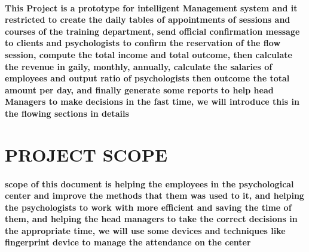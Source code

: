 \documentclass[../Psychological_system_web_application.tex]{subfiles}
\begin{document}
			\paragraph*{This Project is a prototype for intelligent Management system and it restricted to create the daily tables of appointments of sessions and courses of the training department, send official confirmation message to clients and \gls{psychologist}s to confirm the reservation of the flow session, compute the total income and total outcome, then calculate the revenue in gaily, monthly, annually, calculate the salaries of employees and output ratio of psychologists then outcome the total amount per day, and finally generate some reports to help head Managers to make decisions in the fast time, we will introduce this in the flowing sections in details}
		
		\section{PROJECT SCOPE}
		
			\paragraph*{ scope of this document is helping the employees in the psychological center and improve the methods that them was used to it, and helping the \gls{psychologist}s to work with more efficient and saving the time of them, and helping the head managers to take the correct decisions in the appropriate time, we will use some devices and techniques like fingerprint device to manage the attendance on the center }
			\paragraph{ }
			
\end{document}
